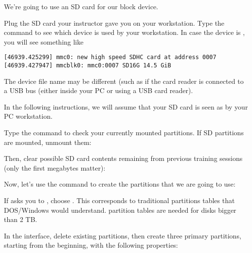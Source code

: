We're going to use an SD card for our block device.

Plug the SD card your instructor gave you on your workstation. Type
the  command to see which device is used by your
workstation. In case the device is , you will see
something like

\begin{verbatim}
[46939.425299] mmc0: new high speed SDHC card at address 0007
[46939.427947] mmcblk0: mmc0:0007 SD16G 14.5 GiB
\end{verbatim}

The device file name may be different (such as 
if the card reader is connected to a USB bus (either inside your PC
or using a USB card reader).

In the following instructions, we will assume that your SD card
is seen as  by your PC workstation.

Type the  command to check your currently mounted
partitions. If SD partitions are mounted, unmount them:


Then, clear possible SD card contents remaining from previous
training sessions (only the first megabytes matter):


Now, let's use the  command to create the partitions that
we are going to use:


If  asks you to , choose
. This corresponds to traditional partitions tables that DOS/Windows
would understand.  partition tables are needed for disks bigger
than 2 TB.

In the  interface, delete existing partitions, then
create three primary partitions, starting from the beginning, with the
following properties:

